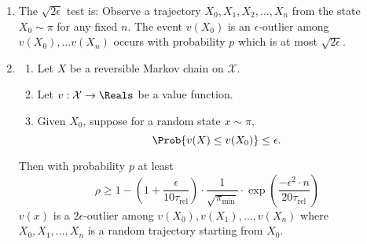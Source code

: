 \documentclass[12pt]{article}
\begin{document}
\begin{enumerate}
    \item
        The \( \sqrt{2\epsilon} \) test is:  Observe a trajectory \( X_0,
        X_1, X_2, \dots, X_n \) from the state \( X_0 \sim \pi \) for
        any fixed \( n \).  The event \( v(X_0) \) is an \( \epsilon \)-outlier
        among \( v(X_0), \dots v(X_n ) \) occurs with probability \( p \) which
        is at most \( \sqrt {2\epsilon} \).
    \item
        \begin{theorem}
            \begin{enumerate}
                \item
                    Let \( X \) be a reversible Markov chain on \(
                    \mathcal{X} \).
                \item
                    Let \( v :  \mathcal{X} \to \Reals \) be a value
                    function.
                \item
                    Given \( X_0 \), suppose for a random state \(
                    x \sim \pi \),
                    \[
                        \Prob{v(X) \le v(X_0)} \le \epsilon.
                    \]
            \end{enumerate}
            Then with probability \( p \) at least
            \[
                \rho \ge 1 - \left( 1 + \frac{\epsilon}{10 \tau_{\text{rel}}}
                \right) \cdot \frac{1}{\sqrt{\pi_{\min}}} \cdot \exp
                \left( \frac {-\epsilon^ {2} \cdot n}{20 \tau_{\text{rel}}}
                \right)
            \] \( v(x) \) is a \( 2\epsilon \)-outlier among \( v(X_0),
            v(X_1), \dots, v(X_n) \) where \( X_0, X_1,
            \dots, X_n \) is a random trajectory starting from \(
            X_0 \).
        \end{theorem}
\end{enumerate}

\hr

\end{document}
